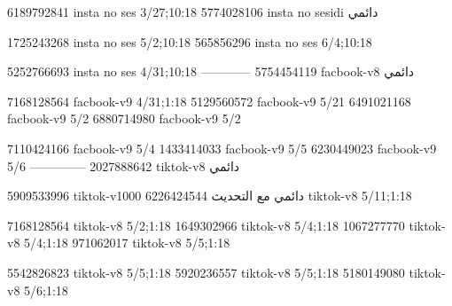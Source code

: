 
6189792841 insta no ses
3/27;10:18
5774028106 insta no sesidi
دائمي


1725243268 insta no ses
5/2;10:18
565856296 insta no ses
6/4;10:18

5252766693 insta no ses
4/31;10:18
------------
5754454119 facbook-v8
دائمي

7168128564 facbook-v9
4/31;1:18
5129560572 facbook-v9
5/21
6491021168 facbook-v9
5/2
6880714980 facbook-v9
5/2

7110424166 facbook-v9
5/4
1433414033 facbook-v9
5/5
6230449023 facbook-v9
5/6
--------------
2027888642 tiktok-v8
دائمي

5909533996 tiktok-v1000
دائمي مع التحديث
6226424544 tiktok-v8
5/11;1:18

7168128564 tiktok-v8
5/2;1:18
1649302966 tiktok-v8
5/4;1:18
1067277770 tiktok-v8
5/4;1:18
971062017 tiktok-v8
5/5;1:18

5542826823 tiktok-v8
5/5;1:18
5920236557 tiktok-v8
5/5;1:18
5180149080 tiktok-v8
5/6;1:18
